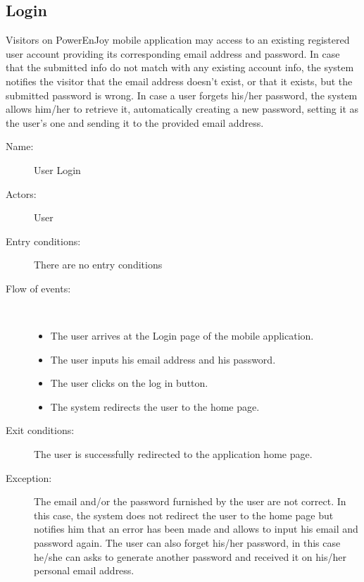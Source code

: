\subsection{Login}
Visitors on PowerEnJoy mobile application may access to an existing registered user account providing its corresponding email address and password. In case that the submitted info do not match with any existing account info, the system notifies the visitor that the email address doesn't exist, or that it exists, but the submitted password is wrong. In case a user forgets his/her password, the system allows him/her to retrieve it, automatically creating a new password, setting it as the user's one and sending it to the provided email address.
\begin{description}
	\item[Name:] User Login
	\item[Actors:] User
	\item[Entry conditions:] There are no entry conditions
	\item[Flow of events:]  \ \\
		\begin{itemize}
			\item The user arrives at the Login page of the mobile application.
			\item The user inputs his email address and his password.
			\item The user clicks on the log in button.
			\item The system redirects the user to the home page.
		\end{itemize}
	\item[Exit conditions:] The user is successfully redirected to the application home page.
	\item [Exception:] The email and/or the password furnished by the user are not correct. In this case, the system does not redirect the user to the home page but notifies him that an error has been made and allows to input his email and password again. The user can also forget his/her password, in this case he/she can asks to generate another password and received it on his/her personal email address.
\end{description}

